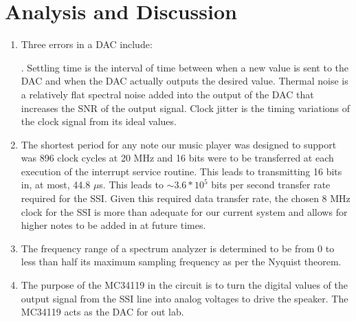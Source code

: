 \documentclass{article}
\begin{document}
\section{Analysis and Discussion}
\begin{enumerate}
	\item %
		Three errors in a DAC include:
		.
		Settling time is the interval of time between when a new value is sent to the DAC and when the DAC actually outputs the desired value. Thermal noise is a relatively flat spectral noise added into the output of the DAC that increases the SNR of the output signal. Clock jitter is the timing variations of the clock signal from its ideal values.
	\item %
		The shortest period for any note our music player was designed to support was 896 clock cycles at 20 MHz and 16 bits were to be transferred at each execution of the interrupt service routine. This leads to transmitting 16 bits in, at most, 44.8 $\mu$s. This leads to $\sim3.6*10^5$ bits per second transfer rate required for the SSI. Given this required data transfer rate, the chosen 8 MHz clock for the SSI is more than adequate for our current system and allows for higher notes to be added in at future times.
	\item %
		The frequency range of a spectrum analyzer is determined to be from 0 to less than half its maximum sampling frequency as per the Nyquist theorem.
	\item %
		The purpose of the MC34119 in the circuit is to turn the digital values of the output signal from the SSI line into analog voltages to drive the speaker. The MC34119 acts as the DAC for out lab.
\end{enumerate}
\end{document}
